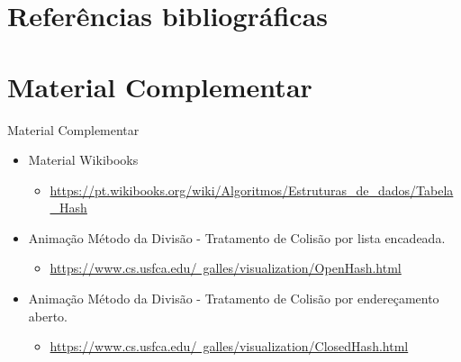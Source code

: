 \documentclass[aspectratio=169]{beamer}
\begin{document}



\section{Referências bibliográficas}

\section{Material Complementar}

\begin{frame}{Material Complementar}
   \begin{itemize}
	\item Material Wikibooks
	\begin{itemize}
	 \item \href{https://pt.wikibooks.org/wiki/Algoritmos/Estruturas_de_dados/Tabela_Hash}{https://pt.wikibooks.org/wiki/Algoritmos/Estruturas\_de\_dados/Tabela\_Hash} 
	\end{itemize}		
   \item Animação Método da Divisão - Tratamento de Colisão por lista encadeada.
   \begin{itemize}
   \item \href{https://www.cs.usfca.edu/~galles/visualization/OpenHash.html}{https://www.cs.usfca.edu/~galles/visualization/OpenHash.html}      
   \end{itemize}
   \item Animação Método da Divisão - Tratamento de Colisão por endereçamento aberto.
   \begin{itemize}
   \item \href{https://www.cs.usfca.edu/~galles/visualization/ClosedHash.html}{https://www.cs.usfca.edu/~galles/visualization/ClosedHash.html}   
   \end{itemize}
   \end{itemize}
\end{frame}    
\end{document}
